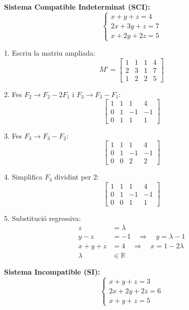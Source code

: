 \documentclass[12pt]{article}
\begin{document}
\begin{exemple}
\textbf{Sistema Compatible Indeterminat (SCI):}
\[
\begin{cases}
x + y + z = 4 \\
2x + 3y + z = 7 \\
x + 2y + 2z = 5
\end{cases}
\]

1. Escriu la matriu ampliada:
\[
M' =
\begin{bmatrix}
1 & 1 & 1 & 4 \\
2 & 3 & 1 & 7 \\
1 & 2 & 2 & 5
\end{bmatrix}
\]

2. Fes \(F_2 \to F_2 - 2F_1\) i \(F_3 \to F_3 - F_1\):
\[
\begin{bmatrix}
1 & 1 & 1 & 4 \\
0 & 1 & -1 & -1 \\
0 & 1 & 1 & 1
\end{bmatrix}
\]

3. Fes \(F_3 \to F_3 - F_2\):
\[
\begin{bmatrix}
1 & 1 & 1 & 4 \\
0 & 1 & -1 & -1 \\
0 & 0 & 2 & 2
\end{bmatrix}
\]

4. Simplifica \(F_3\) dividint per 2:
\[
\begin{bmatrix}
1 & 1 & 1 & 4 \\
0 & 1 & -1 & -1 \\
0 & 0 & 1 & 1
\end{bmatrix}
\]

5. Substitució regressiva:
\begin{align*}
z &= \lambda \\
y - z &= -1 \quad \Rightarrow \quad y = \lambda - 1 \\
x + y + z &= 4 \quad \Rightarrow \quad x = 1 - 2\lambda \\
\lambda &\in \mathbb{R}
\end{align*}
\end{exemple}


\begin{exemple}
\textbf{Sistema Incompatible (SI):}
\[
\begin{cases}
x + y + z = 3 \\
2x + 2y + 2z = 6 \\
x + y + z = 5
\end{cases}
\]

\end{exemple}
\end{document}
